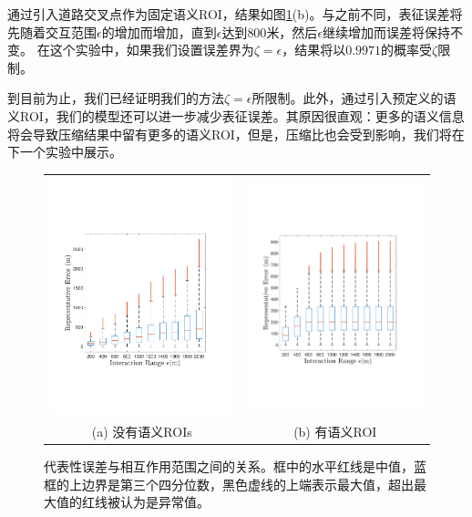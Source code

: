 通过引入道路交叉点作为固定语义ROI，结果如图\ref{fig:relation}(b)。与之前不同，表征误差将先随着交互范围$\epsilon$的增加而增加，直到$\epsilon$达到$800$米，然后$\epsilon$继续增加而误差将保持不变。 在这个实验中，如果我们设置误差界为$ \zeta =\epsilon $，结果将以$ 0.9971 $的概率受$ \zeta $限制。

到目前为止，我们已经证明我们的方法$ \zeta = \epsilon$所限制。此外，通过引入预定义的语义ROI，我们的模型还可以进一步减少表征误差。其原因很直观：更多的语义信息将会导致压缩结果中留有更多的语义ROI，但是，压缩比也会受到影响，我们将在下一个实验中展示。

\tabcolsep=3pt
\begin{figure}[!htb]
\centering
\begin{tabular}{cc}
\includegraphics[width=70mm]{pics/relation_without2.pdf}&
\includegraphics[width=68mm]{pics/relation_with2.pdf}\\
(a) 没有语义ROIs & (b) 有语义ROI \\
\end{tabular}
\caption{代表性误差与相互作用范围之间的关系。框中的水平红线是中值，蓝框的上边界是第三个四分位数，黑色虚线的上端表示最大值，超出最大值的红线被认为是异常值。}
\label{fig:relation}
\end{figure}



